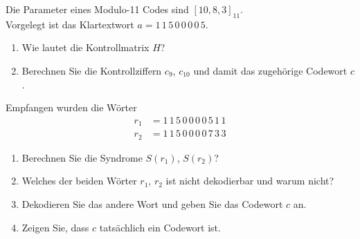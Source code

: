 \begin{aufgabe}
Die Parameter eines Modulo-11 Codes sind $[10, 8, 3]_{11}$.\\
Vorgelegt ist das Klartextwort $a = 1\,1\,5\,0\,0\,0\,0\,5$.
\begin{enumerate}[label=\alph*)]
  \item Wie lautet die Kontrollmatrix $H$?
  \item Berechnen Sie die Kontrollziffern $c_9$, $c_{10}$ und damit das zugehörige Codewort $c$.
\end{enumerate}
Empfangen wurden die Wörter
\begin{align*}
  r_1 &= 1\,1\,5\,0\,0\,0\,0\,5\,1\,1\\
  r_2 &= 1\,1\,5\,0\,0\,0\,0\,7\,3\,3
\end{align*}
\begin{enumerate}[label=\alph*), start=3]
  \item Berechnen Sie die Syndrome $S(r_1)$, $S(r_2)$?
  \item Welches der beiden Wörter $r_1$, $r_2$ ist nicht dekodierbar und warum nicht?
  \item Dekodieren Sie das andere Wort und geben Sie das Codewort $c$ an.
  \item Zeigen Sie, dass $c$ tatsächlich ein Codewort ist.
\end{enumerate}
\end{aufgabe}
